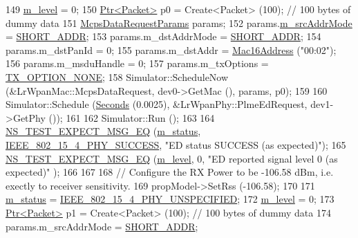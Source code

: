 \begin{DoxyCode}
149   \hyperlink{classLrWpanEdTestCase_a7ecaee7923b4d55cc4a8545bc0332469}{m\_level} = 0;
150   \hyperlink{classns3_1_1Ptr}{Ptr<Packet>} p0 = Create<Packet> (100);  \textcolor{comment}{// 100 bytes of dummy data}
151   \hyperlink{structns3_1_1McpsDataRequestParams}{McpsDataRequestParams} params;
152   params.\hyperlink{structns3_1_1McpsDataRequestParams_a31f4c281d07cf3b5992d45416bd71309}{m\_srcAddrMode} = \hyperlink{group__lr-wpan_gga9ea4702ab11d5329e1593afebce06bbba7bf58267dde39bdabfeeb5793450c5e3}{SHORT\_ADDR};
153   params.m\_dstAddrMode = \hyperlink{group__lr-wpan_gga9ea4702ab11d5329e1593afebce06bbba7bf58267dde39bdabfeeb5793450c5e3}{SHORT\_ADDR};
154   params.m\_dstPanId = 0;
155   params.m\_dstAddr = \hyperlink{classns3_1_1Mac16Address}{Mac16Address} (\textcolor{stringliteral}{"00:02"});
156   params.m\_msduHandle = 0;
157   params.m\_txOptions = \hyperlink{group__lr-wpan_gga74ea891230ebf45d80d69a67266930a4a873c8b896435efcdd1c058668efb88ea}{TX\_OPTION\_NONE};
158   Simulator::ScheduleNow (&LrWpanMac::McpsDataRequest, dev0->GetMac (), params, p0);
159 
160   Simulator::Schedule (\hyperlink{group__timecivil_ga33c34b816f8ff6628e33d5c8e9713b9e}{Seconds} (0.0025), &LrWpanPhy::PlmeEdRequest, dev1->GetPhy ());
161 
162   Simulator::Run ();
163 
164   \hyperlink{group__testing_ga7304ba46a28d8cf08dfdfd6499cf7068}{NS\_TEST\_EXPECT\_MSG\_EQ} (\hyperlink{classLrWpanEdTestCase_a412f77be5f81e80661cf8e5563e62851}{m\_status}, 
      \hyperlink{group__lr-wpan_gga6494269d13d45c511a07b7ccbb1de754a2a81d56261f039e08cf2dd91de10b618}{IEEE\_802\_15\_4\_PHY\_SUCCESS}, \textcolor{stringliteral}{"ED status SUCCESS (as expected)"});
165   \hyperlink{group__testing_ga7304ba46a28d8cf08dfdfd6499cf7068}{NS\_TEST\_EXPECT\_MSG\_EQ} (\hyperlink{classLrWpanEdTestCase_a7ecaee7923b4d55cc4a8545bc0332469}{m\_level}, 0, \textcolor{stringliteral}{"ED reported signal level 0 (as expected)"}
      );
166 
167 
168   \textcolor{comment}{// Configure the RX Power to be -106.58 dBm, i.e. exectly to receiver sensitivity.}
169   propModel->SetRss (-106.58);
170 
171   \hyperlink{classLrWpanEdTestCase_a412f77be5f81e80661cf8e5563e62851}{m\_status} = \hyperlink{group__lr-wpan_gga6494269d13d45c511a07b7ccbb1de754a33aedad985a3e4dd7a0c6790a2c677a0}{IEEE\_802\_15\_4\_PHY\_UNSPECIFIED};
172   \hyperlink{classLrWpanEdTestCase_a7ecaee7923b4d55cc4a8545bc0332469}{m\_level} = 0;
173   \hyperlink{classns3_1_1Ptr}{Ptr<Packet>} p1 = Create<Packet> (100);  \textcolor{comment}{// 100 bytes of dummy data}
174   params.m\_srcAddrMode = \hyperlink{group__lr-wpan_gga9ea4702ab11d5329e1593afebce06bbba7bf58267dde39bdabfeeb5793450c5e3}{SHORT\_ADDR};

\end{DoxyCode}

